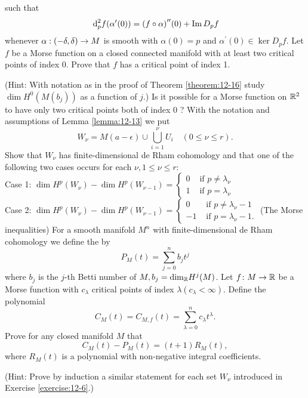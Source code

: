 \begin{enumerate}[label=\theexercise.\arabic*.,ref=\theexercise.\arabic*,leftmargin=2.7em]
    such that
    \[
      {\dd}_{p}^{2}f( {{\alpha }^{\prime }( 0) })  = {( f \circ  \alpha ) }^{\prime \prime }( 0)  + \im{D}_{p}f
    \]
    whenever $\alpha  : ( {-\delta,\delta })  \rightarrow  M$ is smooth with $\alpha ( 0)  = p$ and ${\alpha }^{\prime }( 0)  \in  {\ker}{D}_{p}f$.
  \NewItem Let $f$ be a Morse function on a closed connected manifold with at least two critical points of index 0. Prove that $f$ has a critical point of index 1.
    \par(Hint: With notation as in the proof of Theorem \ref{theorem:12-16} study $\dim {H}^{0}( {M( {b}_{j}) })$ as a function of $j$.)
  \NewItem Is it possible for a Morse function on ${\mathbb{R}}^{2}$ to have only two critical points both of index 0 ?
    \NewItem With the notation and assumptions of Lemma \ref{lemma:12-13} we put
    \[
      {W}_{\nu } = M( {a- \epsilon })  \cup  \mathop{\bigcup }\limits_{i=1}^{\nu }{U}_{i}\quad 
      ( {0 \leq  \nu  \leq  r}).
    \]
    Show that ${W}_{\nu }$ has finite-dimensional de Rham cohomology and that one of the following two cases occurs for each $\nu,1 \leq  \nu  \leq  r$:\\
    Case 1: $\dim {H}^{p}( {W}_{\nu }) - \dim {H}^{p}( {W}_{\nu - 1})  = \begin{cases} 0 & \text{ if }p \neq  {\lambda }_{\nu } \\  1 & \text{ if }p = {\lambda }_{\nu } \end{cases}$\\
    Case 2: $\dim {H}^{p}( {W}_{\nu }) - \dim {H}^{p}( {W}_{\nu - 1})  = \begin{cases} 0 & \text{ if }p \neq  {\lambda }_{\nu }- 1 \\  - 1 & \text{ if }p = {\lambda }_{\nu }- 1. \end{cases}$
  \NewItem (The Morse inequalities) For a smooth manifold ${M}^{n}$ with finite-dimensional de Rham cohomology we define the 
    by
    \[
      {P}_{M}( t)  = \sum_{{j = 0}}^{n}{b}_{j}{t}^{j}
    \]
    where ${b}_{j}$ is the $j$-th Betti number of $M,{b}_{j} = {\dim }_{{\mathbb{R}}}{H}^{j}( M)$. Let $f\colon M \rightarrow  \mathbb{R}$ be a Morse function with ${c}_{\lambda }$ critical points of index $\lambda ( {{c}_{\lambda } < \infty })$. Define the polynomial
    \[
      {C}_{M}( t)  = {C}_{M,f}( t)  = \sum_{{\lambda  = 0}}^{n}{c}_{\lambda }{t}^{\lambda }.
    \]
    Prove for any closed manifold $M$ that
    \[
      {C}_{M}( t) - {P}_{M}( t)  = ( {t + 1}) {R}_{M}( t),
    \]
    where ${R}_{M}( t)$ is a polynomial with non-negative integral coefficients. \par(Hint: Prove by induction a similar statement for each set ${W}_{\nu }$ introduced in Exercise \ref{exercise:12-6}.)

\end{enumerate}
